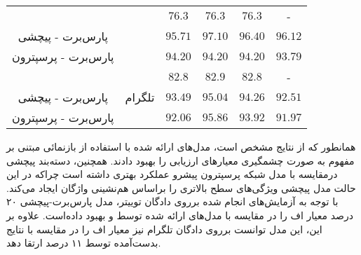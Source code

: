 \begin{itemize}
\begin{table}
\begin{center}
\begin{tabular}{|c|c|c|c|c|c|}
			\cline{1-1}
			\cline{3-6}
			\citep{jahanbakhsh2020model} &
			 & $76.3$ & $76.3$ & $76.3$ & - \\
			\cline{1-1}
			\cline{3-6}
			پارس‌برت - پیچشی & & $95.71$ & $97.10$ & $96.40$ & $96.12$ \\
			\cline{1-1}
			\cline{3-6}
			پارس‌برت - پرسپترون & & $94.20$ & $94.20$ & $94.20$ & $93.79$ \\
			\hline
			\citep{jahanbakhsh2020model} &
			\multirow{3}{*}{تلگرام}& $82.8$ & $82.9$ & $82.8$ & - \\
			\cline{1-1}
			\cline{3-6}
			پارس‌برت - پیچشی & & $93.49$ & $95.04$ & $94.26$ & $92.51$ \\
			\cline{1-1}
			\cline{3-6}
			پارس‌برت - پرسپترون & & $92.06$ & $95.86$ & $93.92$ & $91.97$ \\
			\hline
		\end{tabular}
	\end{center}
\end{table}
\end{itemize}
	
	همانطور که از نتایج مشخص است، مدل‌های ارائه شده با استفاده از بازنمائی‌ مبتنی بر مفهوم به صورت چشمگیری معیار‌های ارزیابی را بهبود دادند. همچنین، دسته‌بند پیچشی درمقایسه با مدل شبکه پرسپترون پیشرو عملکرد بهتری داشته است چراکه در این حالت مدل پیچشی ویژگی‌های سطح بالاتری را براساس هم‌نشینی واژگان ایجاد می‌کند. با توجه به آزمایش‌های انجام شده برروی دادگان توییتر، مدل پارس‌برت-پیچشی ۲۰ درصد معیار اف را در مقایسه با مدل‌های ارائه شده توسط \cite{zamani2017rumor} و \cite{jahanbakhsh2020model} بهبود‌ داده‌است. علاوه بر این، این مدل توانست برروی دادگان تلگرام نیز معیار اف را در مقایسه با نتایج بدست‌آمده توسط \cite{jahanbakhsh2020model} 
	۱۱ درصد ارتقا دهد.
	
